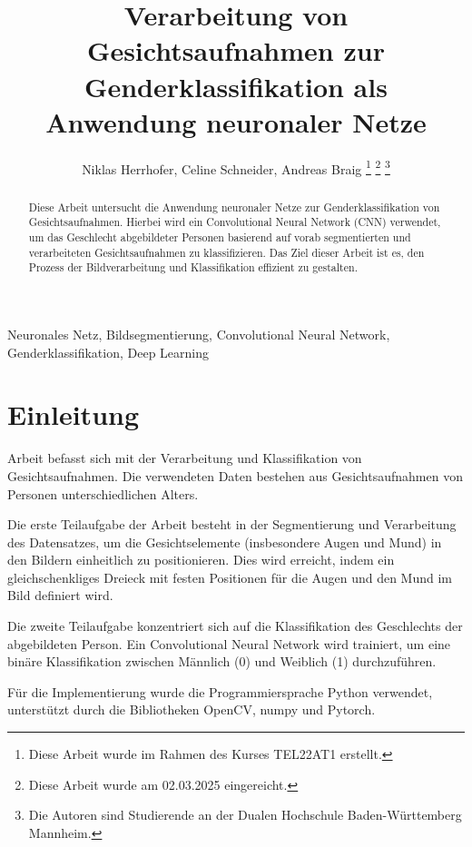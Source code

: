 \documentclass[journal,twoside,web]{ieeecolor}
\begin{document}
\title{Verarbeitung von Gesichtsaufnahmen zur Genderklassifikation als Anwendung neuronaler Netze}
\author{Niklas Herrhofer, Celine Schneider, Andreas Braig
\thanks{Diese Arbeit wurde im Rahmen des Kurses TEL22AT1 erstellt.}
\thanks{Diese Arbeit wurde am 02.03.2025 eingereicht.}  
\thanks{Die Autoren sind Studierende an der Dualen Hochschule Baden-Württemberg Mannheim.}}

\maketitle

\begin{abstract}
    Diese Arbeit untersucht die Anwendung neuronaler Netze zur Genderklassifikation von Gesichtsaufnahmen. Hierbei wird ein Convolutional Neural Network (CNN) verwendet, um das Geschlecht abgebildeter Personen basierend auf vorab segmentierten und verarbeiteten Gesichtsaufnahmen zu klassifizieren. Das Ziel dieser Arbeit ist es, den Prozess der Bildverarbeitung und Klassifikation effizient zu gestalten.
\end{abstract}


\begin{IEEEkeywords}
    Neuronales Netz, Bildsegmentierung, Convolutional Neural Network, Genderklassifikation, Deep Learning
\end{IEEEkeywords}

\section{Einleitung}
\label{sec:introduction}
 Arbeit befasst sich mit der Verarbeitung und Klassifikation von Gesichtsaufnahmen. Die verwendeten Daten bestehen aus Gesichtsaufnahmen von Personen unterschiedlichen Alters. 

Die erste Teilaufgabe der Arbeit besteht in der Segmentierung und Verarbeitung des Datensatzes, um die Gesichtselemente (insbesondere Augen und Mund) in den Bildern einheitlich zu positionieren. Dies wird erreicht, indem ein gleichschenkliges Dreieck mit festen Positionen für die Augen und den Mund im Bild definiert wird. 

Die zweite Teilaufgabe konzentriert sich auf die Klassifikation des Geschlechts der abgebildeten Person. Ein Convolutional Neural Network wird trainiert, um eine binäre Klassifikation zwischen Männlich (0) und Weiblich (1) durchzuführen.

Für die Implementierung wurde die Programmiersprache Python verwendet, unterstützt durch die Bibliotheken OpenCV, numpy und Pytorch.
\end{document}
